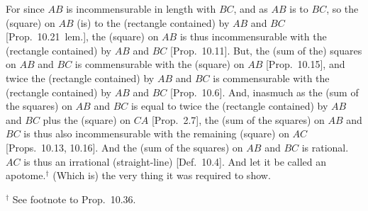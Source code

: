 \begin{Parallel}{}{}
{For since $AB$ is incommensurable in length with $BC$, and as $AB$ is to
$BC$, so the (square) on $AB$ (is) to the (rectangle contained) by $AB$ and
$BC$ [Prop.~10.21~lem.], the
(square) on $AB$ is thus incommensurable with the (rectangle contained)
by $AB$ and $BC$ [Prop.~10.11]. 
But, the (sum of the) squares on $AB$ and $BC$ is commensurable with the
(square) on $AB$ [Prop.~10.15], and twice
the (rectangle contained) by $AB$ and $BC$ is commensurable with the
(rectangle contained) by $AB$ and $BC$ [Prop.~10.6]. And, inasmuch as the (sum of the squares) on $AB$ and $BC$ is equal to twice the (rectangle contained) by
$AB$ and $BC$ plus the (square) on $CA$ [Prop.~2.7], the (sum of the squares) on $AB$ and $BC$
is thus also incommensurable with the remaining (square) on $AC$ [Props.~10.13, 10.16]. 
And the (sum of the squares) on $AB$ and $BC$ is rational. $AC$ is
thus an irrational (straight-line) [Def.~10.4]. And let it be called an
apotome.$^\dag$ (Which is) the very thing it was required to show.}
\end{Parallel}
{\footnotesize\noindent $^\dag$ See footnote to Prop.~10.36.}

